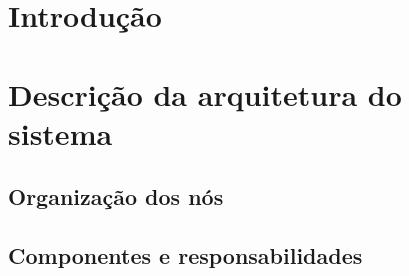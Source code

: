 \section{Introdução}

\section{Descrição da arquitetura do sistema}

\subsection{Organização dos nós}

\subsection{Componentes e responsabilidades}

